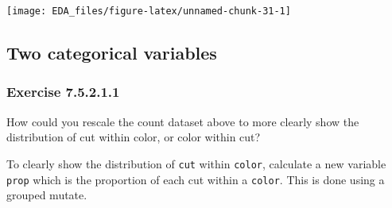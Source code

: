 \documentclass[]{book}
\newenvironment{Shaded}{\begin{snugshade}}{\end{snugshade}}
\newcommand{\CommentTok}[1]{\textcolor[rgb]{0.56,0.35,0.01}{\textit{#1}}}
\newcommand{\DataTypeTok}[1]{\textcolor[rgb]{0.13,0.29,0.53}{#1}}
\newcommand{\DecValTok}[1]{\textcolor[rgb]{0.00,0.00,0.81}{#1}}
\newcommand{\KeywordTok}[1]{\textcolor[rgb]{0.13,0.29,0.53}{\textbf{#1}}}
\newcommand{\NormalTok}[1]{#1}
\newcommand{\OperatorTok}[1]{\textcolor[rgb]{0.81,0.36,0.00}{\textbf{#1}}}
\newcommand{\StringTok}[1]{\textcolor[rgb]{0.31,0.60,0.02}{#1}}
\theoremstyle{plain}
\theoremstyle{remark}
\begin{document}
\begin{center}\texttt{[image: EDA\_files/figure-latex/unnamed-chunk-31-1]} \end{center}

\hypertarget{two-categorical-variables}{%
\subsection{Two categorical variables}\label{two-categorical-variables}}

\hypertarget{exercise-7.5.2.1.1}{%
\subsubsection*{\texorpdfstring{Exercise
{7.5.2.1.1}}{Exercise 7.5.2.1.1}}\label{exercise-7.5.2.1.1}}

How could you rescale the count dataset above to more clearly show the
distribution of cut within color, or color within cut?

To clearly show the distribution of \texttt{cut} within \texttt{color},
calculate a new variable \texttt{prop} which is the proportion of each
cut within a \texttt{color}. This is done using a grouped mutate.

\begin{Shaded}
\end{Shaded}
\end{document}
